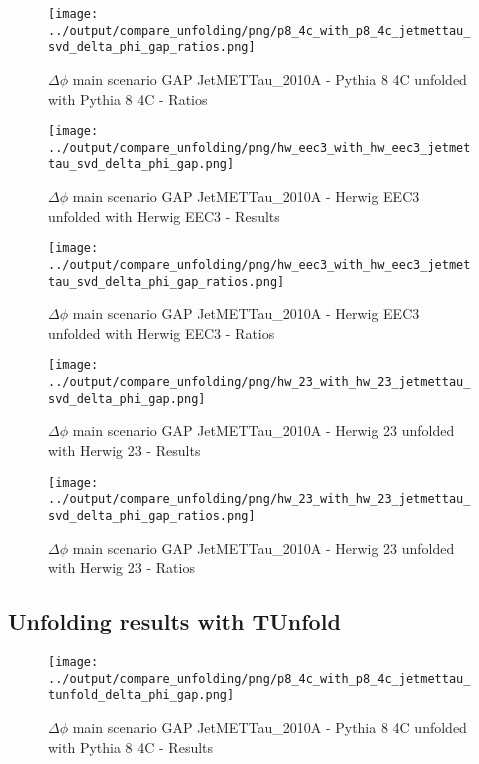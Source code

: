 \documentclass[11pt]{book}
\begin{document}
\begin{figure}[ht]
\centering
\texttt{[image: ../output/compare\_unfolding/png/p8\_4c\_with\_p8\_4c\_jetmettau\_svd\_delta\_phi\_gap\_ratios.png]}
\caption{$\Delta\phi$ main scenario GAP JetMETTau\_2010A - Pythia 8 4C unfolded with Pythia 8 4C - Ratios}
\label{p8_p8_jetmettau_svd_delta_phi_gap_b}
\end{figure}

\begin{figure}[ht]
\centering
\texttt{[image: ../output/compare\_unfolding/png/hw\_eec3\_with\_hw\_eec3\_jetmettau\_svd\_delta\_phi\_gap.png]}
\caption{$\Delta\phi$ main scenario GAP JetMETTau\_2010A - Herwig EEC3 unfolded with Herwig EEC3 - Results}
\label{hw_eec3_hw_eec3_jetmettau_svd_delta_phi_gap_a}
\end{figure}

\begin{figure}[ht]
\centering
\texttt{[image: ../output/compare\_unfolding/png/hw\_eec3\_with\_hw\_eec3\_jetmettau\_svd\_delta\_phi\_gap\_ratios.png]}
\caption{$\Delta\phi$ main scenario GAP JetMETTau\_2010A - Herwig EEC3 unfolded with Herwig EEC3 - Ratios}
\label{hw_eec3_hw_eec3_jetmettau_svd_delta_phi_gap_b}
\end{figure}

\begin{figure}[ht]
\centering
\texttt{[image: ../output/compare\_unfolding/png/hw\_23\_with\_hw\_23\_jetmettau\_svd\_delta\_phi\_gap.png]}
\caption{$\Delta\phi$ main scenario GAP JetMETTau\_2010A - Herwig 23 unfolded with Herwig 23 - Results}
\label{hw_23_hw_23_jetmettau_svd_delta_phi_gap_a}
\end{figure}

\begin{figure}[ht]
\centering
\texttt{[image: ../output/compare\_unfolding/png/hw\_23\_with\_hw\_23\_jetmettau\_svd\_delta\_phi\_gap\_ratios.png]}
\caption{$\Delta\phi$ main scenario GAP JetMETTau\_2010A - Herwig 23 unfolded with Herwig 23 - Ratios}
\label{hw_23_hw_23_jetmettau_svd_delta_phi_gap_b}
\end{figure}


\clearpage
\subsection{Unfolding results with TUnfold}

\begin{figure}[ht]
\centering
\texttt{[image: ../output/compare\_unfolding/png/p8\_4c\_with\_p8\_4c\_jetmettau\_tunfold\_delta\_phi\_gap.png]}
\caption{$\Delta\phi$ main scenario GAP JetMETTau\_2010A - Pythia 8 4C unfolded with Pythia 8 4C - Results}
\label{p8_p8_jetmettau_tunfold_delta_phi_gap_a}
\end{figure}
\end{document}
